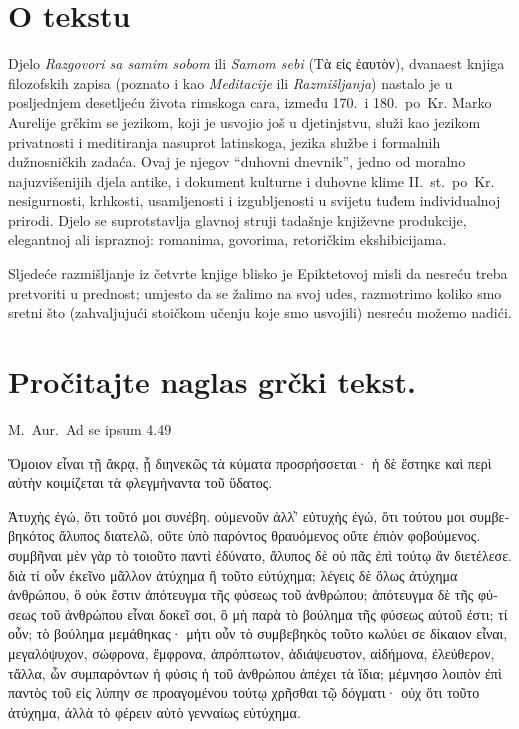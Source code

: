 

\section*{O tekstu}

Djelo \textit{Razgovori sa samim sobom} ili \textit{Samom sebi} \textgreek[variant=ancient]{(Τὰ εἰς ἑαυτὸν),} dvanaest knjiga filozofskih zapisa (poznato i kao \textit{Meditacije} ili \textit{Razmišljanja}) nastalo je u posljednjem desetljeću života rimskoga cara, između 170.\ i 180.\ po~Kr. Marko Aurelije grčkim se jezikom, koji je usvojio još u djetinjstvu, služi kao jezikom privatnosti i meditiranja nasuprot latinskoga, jezika službe i formalnih dužnosničkih zadaća. Ovaj je njegov ``duhovni dnevnik'', jedno od moralno najuzvišenijih djela antike, i dokument kulturne i duhovne klime II.~st.\ po~Kr. nesigurnosti, krhkosti, usamljenosti i izgubljenosti u svijetu tuđem individualnoj prirodi. Djelo se suprotstavlja glavnoj struji tadašnje književne produkcije, elegantnoj ali ispraznoj: romanima, govorima, retoričkim ekshibicijama.

Sljedeće razmišljanje iz četvrte knjige blisko je Epiktetovoj misli da nesreću treba pretvoriti u prednost; umjesto da se žalimo na svoj udes, razmotrimo koliko smo sretni što (zahvaljujući stoičkom učenju koje smo usvojili) nesreću možemo nadići.

\section*{Pročitajte naglas grčki tekst.}

M.\ Aur.\ Ad se ipsum 4.49


\medskip


{\large

\begin{greek}

\noindent Ὅμοιον εἶναι τῇ ἄκρᾳ, ᾗ διηνεκῶς τὰ κύματα προσρήσσεται· ἡ δὲ ἕστηκε καὶ περὶ αὐτὴν κοιμίζεται τὰ φλεγμήναντα τοῦ ὕδατος. 

\noindent Ἀτυχὴς ἐγώ, ὅτι τοῦτό μοι συνέβη. οὐμενοῦν ἀλλ̓' εὐτυχὴς ἐγώ, ὅτι τούτου μοι συμβεβηκότος ἄλυπος διατελῶ, οὔτε ὑπὸ παρόντος θραυόμενος οὔτε ἐπιὸν φοβούμενος. συμβῆναι μὲν γὰρ τὸ τοιοῦτο παντὶ ἐδύνατο, ἄλυπος δὲ οὐ πᾶς ἐπὶ τούτῳ ἂν διετέλεσε. διὰ τί οὖν ἐκεῖνο μᾶλλον ἀτύχημα ἢ τοῦτο εὐτύχημα; λέγεις δὲ ὅλως ἀτύχημα ἀνθρώπου, ὃ οὐκ ἔστιν ἀπότευγμα τῆς φύσεως τοῦ ἀνθρώπου; ἀπότευγμα δὲ τῆς φύσεως τοῦ ἀνθρώπου εἶναι δοκεῖ σοι, ὃ μὴ παρὰ τὸ βούλημα τῆς φύσεως αὐτοῦ ἐστι; τί οὖν; τὸ βούλημα μεμάθηκας· μήτι οὖν τὸ συμβεβηκὸς τοῦτο κωλύει σε δίκαιον εἶναι, μεγαλόψυχον, σώφρονα, ἔμφρονα, ἀπρόπτωτον, ἀδιάψευστον, αἰδήμονα, ἐλεύθερον, τἄλλα, ὧν συμπαρόντων ἡ φύσις ἡ τοῦ ἀνθρώπου ἀπέχει τὰ ἴδια; μέμνησο λοιπὸν ἐπὶ παντὸς τοῦ εἰς λύπην σε προαγομένου τούτῳ χρῆσθαι τῷ δόγματι· οὐχ ὅτι τοῦτο ἀτύχημα, ἀλλὰ τὸ φέρειν αὐτὸ γενναίως εὐτύχημα.

\end{greek}

}



